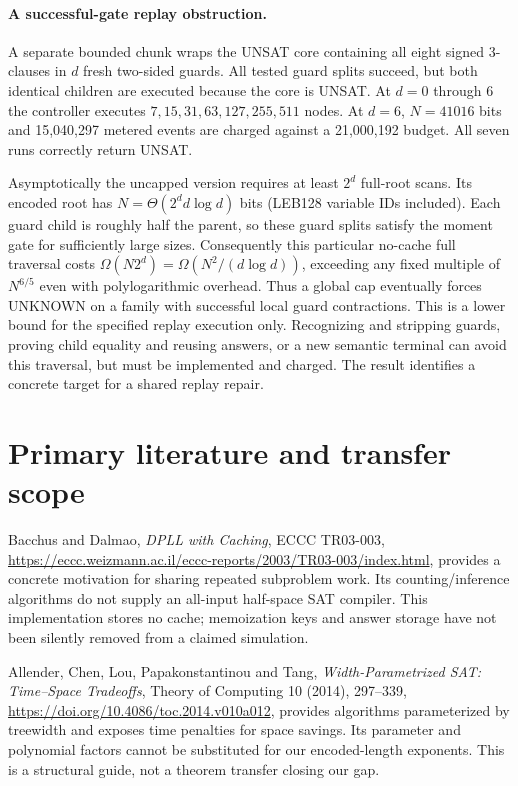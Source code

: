 \documentclass[11pt]{article}
\begin{document}
\paragraph{A successful-gate replay obstruction.}
A separate bounded chunk wraps the UNSAT core containing all eight signed
3-clauses in $d$ fresh two-sided guards. All tested guard splits succeed, but
both identical children are executed because the core is UNSAT. At $d=0$
through $6$ the controller executes $7,15,31,63,127,255,511$ nodes.
At $d=6$, $N=41016$ bits and 15,040,297 metered events are charged against
a 21,000,192 budget. All seven runs correctly return UNSAT.

Asymptotically the uncapped version requires at least $2^d$ full-root scans.
Its encoded root has $N=\Theta(2^d d\log d)$ bits (LEB128 variable IDs
included). Each guard child is roughly half the parent, so these guard
splits satisfy the moment gate for sufficiently large sizes. Consequently
this particular no-cache full traversal costs
$\Omega(N2^d)=\Omega(N^2/(d\log d))$, exceeding any fixed multiple of
$N^{6/5}$ even with polylogarithmic overhead. Thus a global cap eventually
forces UNKNOWN on a family with successful local guard contractions.
This is a lower bound for the specified replay execution only. Recognizing
and stripping guards, proving child equality and reusing answers, or a new
semantic terminal can avoid this traversal, but must be implemented and
charged. The result identifies a concrete target for a shared replay repair.

\section{Primary literature and transfer scope}
Bacchus and Dalmao, \emph{DPLL with Caching}, ECCC TR03-003,
\url{https://eccc.weizmann.ac.il/eccc-reports/2003/TR03-003/index.html},
provides a concrete motivation for sharing repeated subproblem work. Its
counting/inference algorithms do not supply an all-input half-space SAT
compiler. This implementation stores no cache; memoization keys and answer
storage have not been silently removed from a claimed simulation.

Allender, Chen, Lou, Papakonstantinou and Tang, \emph{Width-Parametrized SAT:
Time--Space Tradeoffs}, Theory of Computing 10 (2014), 297--339,
\url{https://doi.org/10.4086/toc.2014.v010a012}, provides algorithms parameterized
by treewidth and exposes time penalties for space savings. Its parameter and
polynomial factors cannot be substituted for our encoded-length exponents.
This is a structural guide, not a theorem transfer closing our gap.
\end{document}
